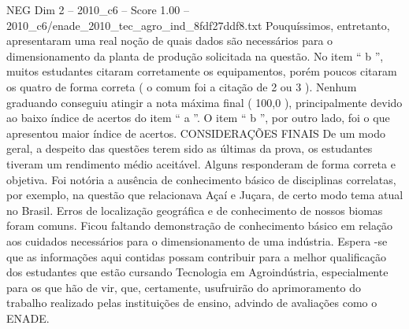 \begin{textsample}{NEG Dim 2 – 2010\_c6 – Score 1.00 – 2010\_c6/enade\_2010\_tec\_agro\_ind\_8fdf27ddf8.txt}
Pouquíssimos, entretanto, apresentaram uma real noção de quais dados são necessários para o dimensionamento da planta de produção solicitada na questão.
No item “ b ”, muitos estudantes citaram corretamente os equipamentos, porém poucos citaram os quatro de forma correta ( o comum foi a citação de 2 ou 3 ).
Nenhum graduando conseguiu atingir a nota máxima final ( 100,0 ), principalmente devido ao baixo índice de acertos do item “ a ”.
O item “ b ”, por outro lado, foi o que apresentou maior índice de acertos.
CONSIDERAÇÕES FINAIS De um modo geral, a despeito das questões terem sido as últimas da prova, os estudantes tiveram um rendimento médio aceitável.
Alguns responderam de forma correta e objetiva.
Foi notória a ausência de conhecimento básico de disciplinas correlatas, por exemplo, na questão que relacionava Açaí e Juçara, de certo modo tema atual no Brasil.
Erros de localização geográfica e de conhecimento de nossos biomas foram comuns.
Ficou faltando demonstração de conhecimento básico em relação aos cuidados necessários para o dimensionamento de uma indústria.
Espera -se que as informações aqui contidas possam contribuir para a melhor qualificação dos estudantes que estão cursando Tecnologia em Agroindústria, especialmente para os que hão de vir, que, certamente, usufruirão do aprimoramento do trabalho realizado pelas instituições de ensino, advindo de avaliações como o ENADE.

\end{textsample}

